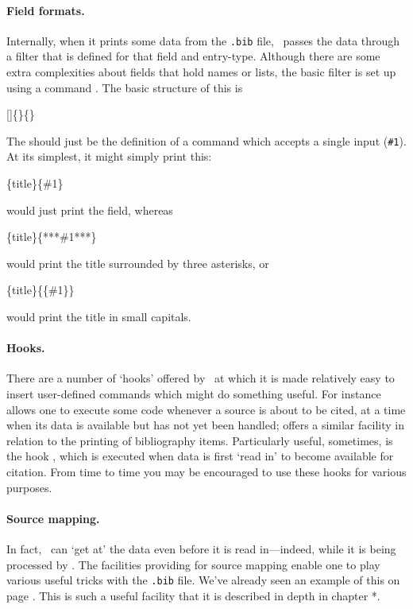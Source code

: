 \paragraph{Field formats.} Internally, when it prints some data from
the \verb|.bib| file, \biblatex\ passes the data through a filter that
is defined for that field and entry-type. Although there are some
extra complexities about fields that hold names or lists, the basic
filter is set up using a command . The basic
structure of this is
\begin{pseudoverb}
[]\{\}\{\}
\end{pseudoverb}
The  should just be the definition of a command which
accepts a single input (\texttt{\#1}). At its simplest, it
might simply print this:
\begin{pseudoverb}
\{title\}\{\#1\}
\end{pseudoverb}
would just print the field, whereas
\begin{pseudoverb}
\{title\}\{***\#1***\}
\end{pseudoverb}
would print the title surrounded by three asterisks, or
\begin{pseudoverb}
\{title\}\{\{\#1\}\}
\end{pseudoverb}
would print the title in small capitals.

\paragraph{Hooks.} There are a number of `hooks' offered by \biblatex\
at which it is made relatively easy to insert user-defined commands
which might do something useful. For instance \cs{AtEveryCitekey} allows
one to execute some code whenever a source is about to be cited, at a
time when its data is available but has not yet been handled;
 offers a similar facility in relation to the
printing of bibliography items. Particularly useful, sometimes, is the
hook \cs{AtDataInput}, which is executed when data is first `read in'
to become available for citation. From time to time you may be
encouraged to use these hooks for various purposes.

\paragraph{Source mapping.} In fact, \biblatex\ can `get at' the data
even before it is read in---indeed, while it is being processed by
\package{biber}. The facilities providing for source mapping enable
one to play various useful tricks with the \verb|.bib| file. We've
already seen an example of this on page \pageref{datamap}. This is
such a useful facility that it is described in depth in chapter *.

